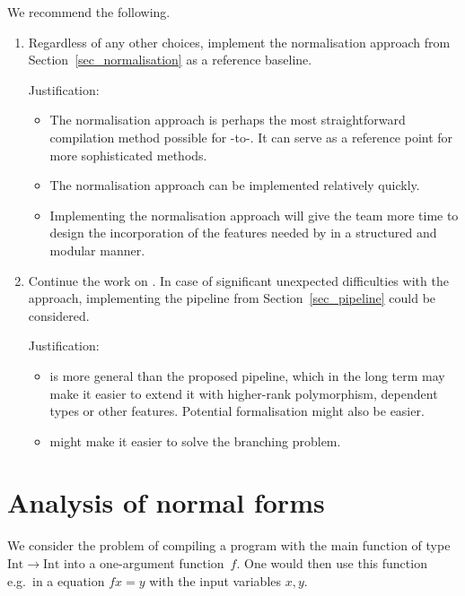 \documentclass[final]{msc}
\begin{document}
We recommend the following.
\begin{enumerate}
\item Regardless of any other choices, implement the normalisation
  approach from Section~\ref{sec_normalisation} as a reference
  baseline.
  \medskip

  Justification:
  \begin{itemize}
  \item The normalisation approach is perhaps the most straightforward
    compilation method possible for \Juvix{}-to-\VampIR{}. It can serve as a reference point for more sophisticated methods.
  \item The normalisation approach can be implemented relatively quickly.
  \item Implementing the normalisation approach will give the \Geb{} team
    more time to design the incorporation of the features needed by
    \Juvix{} in a structured and modular manner.
  \end{itemize}
\item Continue the work on \Geb{}. In case of significant unexpected
  difficulties with the \Geb{} approach, implementing the pipeline from
  Section~\ref{sec_pipeline} could be considered.
  \medskip

  Justification:
  \begin{itemize}
  \item \Geb{} is more general than the proposed pipeline, which in the
    long term may make it easier to extend it with higher-rank
    polymorphism, dependent types or other features. Potential
    formalisation might also be easier.
  \item \Geb{} might make it easier to solve the branching problem.
  \end{itemize}
\end{enumerate}

\appendix

\renewcommand{\thesection}{\Alph{section}}

\section{Analysis of normal forms}\label{sec_normal_forms}

We consider the problem of compiling a \Juvix{} program with the main
function of type $\mathrm{Int} \to \mathrm{Int}$ into a one-argument
\VampIR{} function~$f$. One would then use this function e.g.~in a \VampIR{}
equation $f x = y$ with the input variables $x,y$.
\end{document}
